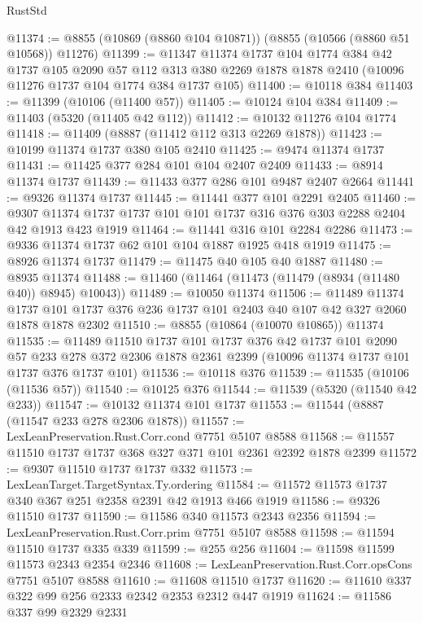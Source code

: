 \begin{lexlean}{RustStd}
\begin{coremodule}
@11374 := @8855 (@10869 (@8860 @104 @10871)) (@8855 (@10566 (@8860 @51 @10568)) @11276)
@11399 := @11347
    @11374
    @1737
    @104
    @1774
    @384
    @42
    @1737
    @105
    @2090
    @57
    @112
    @313
    @380
    @2269
    @1878
    @1878
    @2410
    (@10096 @11276 @1737 @104 @1774 @384 @1737 @105)
@11400 := @10118 @384
@11403 := @11399 (@10106 (@11400 @57))
@11405 := @10124 @104 @384
@11409 := @11403 (@5320 (@11405 @42 @112))
@11412 := @10132 @11276 @104 @1774
@11418 := @11409 (@8887 (@11412 @112 @313 @2269 @1878))
@11423 := @10199 @11374 @1737 @380 @105 @2410
@11425 := @9474 @11374 @1737
@11431 := @11425 @377 @284 @101 @104 @2407 @2409
@11433 := @8914 @11374 @1737
@11439 := @11433 @377 @286 @101 @9487 @2407 @2664
@11441 := @9326 @11374 @1737
@11445 := @11441 @377 @101 @2291 @2405
@11460 := @9307 @11374 @1737 @1737 @101 @101 @1737 @316 @376 @303 @2288 @2404 @42 @1913 @423 @1919
@11464 := @11441 @316 @101 @2284 @2286
@11473 := @9336 @11374 @1737 @62 @101 @104 @1887 @1925 @418 @1919
@11475 := @8926 @11374 @1737
@11479 := @11475 @40 @105 @40 @1887
@11480 := @8935 @11374
@11488 := @11460 (@11464 (@11473 (@11479 (@8934 (@11480 @40)) @8945) @10043))
@11489 := @10050 @11374
@11506 := @11489
    @11374
    @1737
    @101
    @1737
    @376
    @236
    @1737
    @101
    @2403
    @40
    @107
    @42
    @327
    @2060
    @1878
    @1878
    @2302
@11510 := @8855 (@10864 (@10070 @10865)) @11374
@11535 := @11489
    @11510
    @1737
    @101
    @1737
    @376
    @42
    @1737
    @101
    @2090
    @57
    @233
    @278
    @372
    @2306
    @1878
    @2361
    @2399
    (@10096 @11374 @1737 @101 @1737 @376 @1737 @101)
@11536 := @10118 @376
@11539 := @11535 (@10106 (@11536 @57))
@11540 := @10125 @376
@11544 := @11539 (@5320 (@11540 @42 @233))
@11547 := @10132 @11374 @101 @1737
@11553 := @11544 (@8887 (@11547 @233 @278 @2306 @1878))
@11557 := LexLeanPreservation.Rust.Corr.cond @7751 @5107 @8588
@11568 := @11557 @11510 @1737 @1737 @368 @327 @371 @101 @2361 @2392 @1878 @2399
@11572 := @9307 @11510 @1737 @1737 @332
@11573 := LexLeanTarget.TargetSyntax.Ty.ordering
@11584 := @11572 @11573 @1737 @340 @367 @251 @2358 @2391 @42 @1913 @466 @1919
@11586 := @9326 @11510 @1737
@11590 := @11586 @340 @11573 @2343 @2356
@11594 := LexLeanPreservation.Rust.Corr.prim @7751 @5107 @8588
@11598 := @11594 @11510 @1737 @335 @339
@11599 := @255 @256
@11604 := @11598 @11599 @11573 @2343 @2354 @2346
@11608 := LexLeanPreservation.Rust.Corr.opsCons @7751 @5107 @8588
@11610 := @11608 @11510 @1737
@11620 := @11610 @337 @322 @99 @256 @2333 @2342 @2353 @2312 @447 @1919
@11624 := @11586 @337 @99 @2329 @2331

\end{coremodule}
\end{lexlean}
